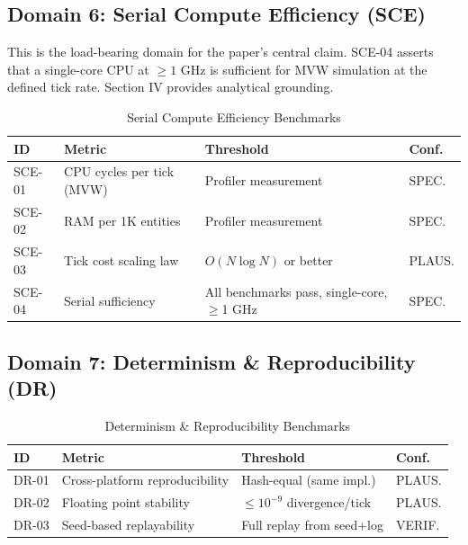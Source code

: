 \documentclass[conference]{IEEEtran}
\begin{document}
\subsection{Domain 6: Serial Compute Efficiency (SCE)}

This is the load-bearing domain for the paper's central claim. SCE-04 asserts that
a single-core CPU at $\geq 1$ GHz is sufficient for MVW simulation at the defined
tick rate. Section IV provides analytical grounding.

\begin{table}[ht]
\caption{Serial Compute Efficiency Benchmarks}
\label{tab:sce}
\centering
\small
\begin{tabular}{p{0.7cm}p{3.2cm}p{1.8cm}p{1.0cm}}
\toprule
\textbf{ID} & \textbf{Metric} & \textbf{Threshold} & \textbf{Conf.} \\
\midrule
SCE-01 & CPU cycles per tick (MVW) & Profiler measurement & SPEC. \\
SCE-02 & RAM per 1K entities & Profiler measurement & SPEC. \\
SCE-03 & Tick cost scaling law & $O(N \log N)$ or better & PLAUS. \\
SCE-04 & Serial sufficiency & All benchmarks pass, single-core, $\geq$1 GHz & SPEC. \\
\bottomrule
\end{tabular}
\end{table}

\subsection{Domain 7: Determinism \& Reproducibility (DR)}

\begin{table}[ht]
\caption{Determinism \& Reproducibility Benchmarks}
\label{tab:dr}
\centering
\small
\begin{tabular}{p{0.7cm}p{3.2cm}p{1.8cm}p{1.0cm}}
\toprule
\textbf{ID} & \textbf{Metric} & \textbf{Threshold} & \textbf{Conf.} \\
\midrule
DR-01 & Cross-platform reproducibility & Hash-equal (same impl.) & PLAUS. \\
DR-02 & Floating point stability & $\leq 10^{-9}$ divergence/tick & PLAUS. \\
DR-03 & Seed-based replayability & Full replay from seed+log & VERIF. \\
\bottomrule
\end{tabular}
\end{table}
\end{document}
